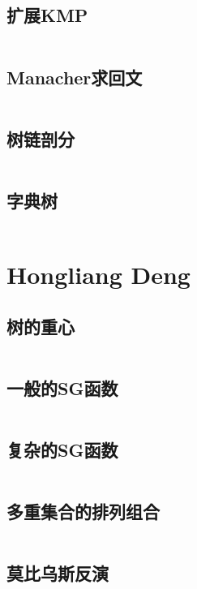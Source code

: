 \documentclass[a4paper,11pt]{article}
\begin{document}
\subsection{扩展KMP}
\inputminted[breaklines]{c++}{Li/扩展KMP.cpp}
\subsection{Manacher求回文}
\inputminted[breaklines]{c++}{Li/Manacher求回文.cpp}
\subsection{树链剖分}
\inputminted[breaklines]{c++}{Li/树链剖分.cpp}
\subsection{字典树}
\inputminted[breaklines]{c++}{Li/字典树.cpp}

\newpage
\newpage
\newpage

\section{Hongliang Deng}
\subsection{树的重心}
\inputminted[breaklines]{c++}{Deng/树的重心.cpp}
\subsection{一般的SG函数}
\inputminted[breaklines]{c++}{Deng/一般的SG函数.cpp}
\subsection{复杂的SG函数}
\inputminted[breaklines]{c++}{Deng/复杂的SG函数.cpp}
\subsection{多重集合的排列组合}
\inputminted[breaklines]{c++}{Deng/多重集合的排列组合.cpp}
\subsection{莫比乌斯反演}
\inputminted[breaklines]{c++}{Deng/莫比乌斯反演.cpp}
\end{document}
